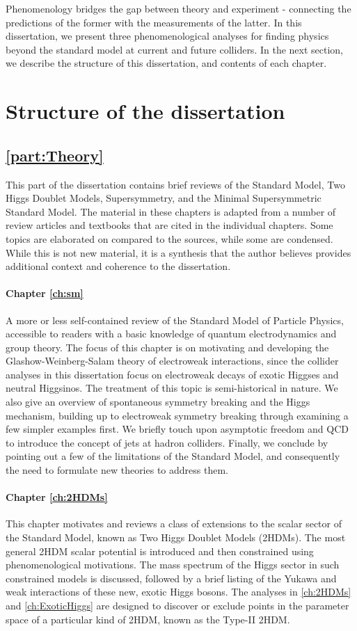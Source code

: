 Phenomenology bridges the gap between theory and experiment - connecting the predictions of the former with the measurements of the latter. In this dissertation, we present three phenomenological analyses for finding physics beyond the standard model at current and future colliders. In the next section, we describe the structure of this dissertation, and contents of each chapter.

\section{Structure of the dissertation}
\subsection{\autoref{part:Theory}}
This part of the dissertation contains brief reviews of the Standard Model, Two Higgs Doublet Models, Supersymmetry, and the Minimal Supersymmetric Standard Model. The material in these chapters is adapted from a number of review articles and textbooks that are cited in the individual chapters. Some topics are elaborated on compared to the sources, while some are condensed.  While this is not new material, it is a synthesis that the author believes provides additional context and coherence to the dissertation.
\paragraph{Chapter \ref{ch:sm}} A more or less self-contained review of the Standard Model of Particle Physics, accessible to readers with a basic knowledge of quantum electrodynamics and group theory. The focus of this chapter is on motivating and developing the Glashow-Weinberg-Salam theory of electroweak interactions, since the collider analyses in this dissertation focus on electroweak decays of exotic Higgses and neutral Higgsinos. The treatment of this topic is semi-historical in nature. We also give an overview of spontaneous symmetry breaking and the Higgs mechanism, building up to electroweak symmetry breaking through examining a few simpler examples first. We briefly touch upon asymptotic freedom and QCD to introduce the concept of jets at hadron colliders. Finally, we conclude by pointing out a few of the limitations of the Standard Model, and consequently the need to formulate new theories to address them.
\paragraph{Chapter \ref{ch:2HDMs}} This chapter motivates and reviews a class of extensions to the scalar sector of the Standard Model, known as Two Higgs Doublet Models (2HDMs). The most general 2HDM scalar potential is introduced and then constrained using phenomenological motivations. The mass spectrum of the Higgs sector in such constrained models is discussed, followed by a brief listing of the Yukawa and weak interactions of these new, exotic Higgs bosons. The analyses in \autoref{ch:2HDMs} and \autoref{ch:ExoticHiggs} are designed to discover or exclude points in the parameter space of a particular kind of 2HDM, known as the Type-II 2HDM.
